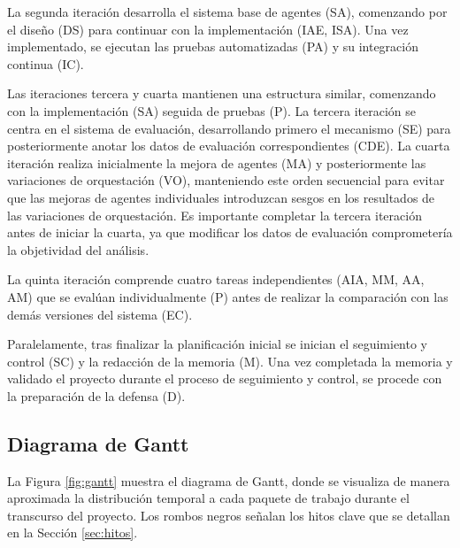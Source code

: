 La segunda iteración desarrolla el sistema base de agentes (SA), comenzando por el diseño (DS) para continuar con la implementación (IAE, ISA). Una vez implementado, se ejecutan las pruebas automatizadas (PA) y su integración continua (IC).

Las iteraciones tercera y cuarta mantienen una estructura similar, comenzando con la implementación (SA) seguida de pruebas (P). La tercera iteración se centra en el sistema de evaluación, desarrollando primero el mecanismo (SE) para posteriormente anotar los datos de evaluación correspondientes (CDE). La cuarta iteración realiza inicialmente la mejora de agentes (MA) y posteriormente las variaciones de orquestación (VO), manteniendo este orden secuencial para evitar que las mejoras de agentes individuales introduzcan sesgos en los resultados de las variaciones de orquestación. Es importante completar la tercera iteración antes de iniciar la cuarta, ya que modificar los datos de evaluación comprometería la objetividad del análisis.

La quinta iteración comprende cuatro tareas independientes (AIA, MM, AA, AM) que se evalúan individualmente (P) antes de realizar la comparación con las demás versiones del sistema (EC).

Paralelamente, tras finalizar la planificación inicial se inician el seguimiento y control (SC) y la redacción de la memoria (M). Una vez completada la memoria y validado el proyecto durante el proceso de seguimiento y control, se procede con la preparación de la defensa (D).

\subsection{Diagrama de Gantt}

La Figura \ref{fig:gantt} muestra el diagrama de Gantt, donde se visualiza de manera aproximada la distribución temporal a cada paquete de trabajo durante el transcurso del proyecto. Los rombos negros señalan los hitos clave que se detallan en la Sección \ref{sec:hitos}.


